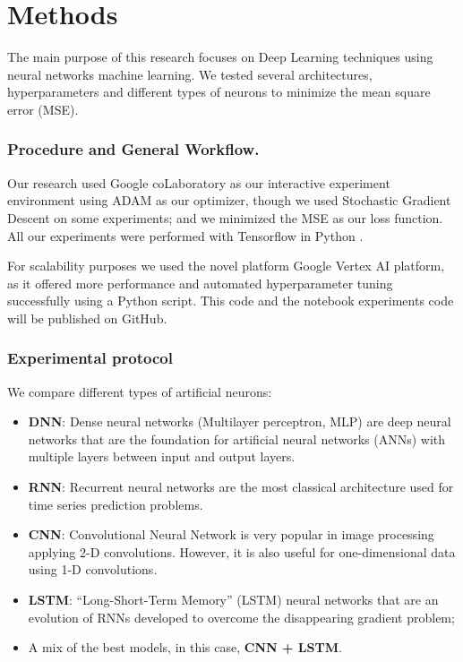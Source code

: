 \documentclass{llncs}
\begin{document}
    \hypertarget{model.}{%
\section{Methods}\label{model}}

The main purpose of this research focuses on Deep Learning techniques
using neural networks machine learning. We tested several architectures,
hyperparameters and different types of neurons to minimize the mean
square error (MSE).

\hypertarget{procedure-and-general-workflow.}{%
\subsubsection{Procedure and General
Workflow.}\label{procedure-and-general-workflow.}}

Our research used Google coLaboratory \cite{googlecolab} as our 
interactive experiment environment
using ADAM as our optimizer, though we used Stochastic Gradient Descent
on some experiments; and we minimized the MSE as our loss function. All
our experiments were performed with Tensorflow in Python \cite{abadi}.

For scalability purposes we used the novel platform 
Google Vertex AI \cite{vertexai}
platform, as it offered more performance and automated hyperparameter
tuning successfully using a Python script. This code and the notebook
experiments code will be published on GitHub.

\hypertarget{experimental-protocol}{%
\subsubsection{Experimental protocol}\label{experimental-protocol}}

We compare different types of
artificial neurons:

\begin{itemize}
\item
  \textbf{DNN}: Dense neural networks (Multilayer perceptron, MLP) are deep neural networks that are
  the foundation for artificial neural networks (ANNs) with multiple
  layers between input and output layers.
\item
  \textbf{RNN}: Recurrent neural networks are the most classical
  architecture used for time series prediction problems.
\item
  \textbf{CNN}: Convolutional Neural Network is very popular in image
  processing applying 2-D convolutions. However, it is also useful for one-dimensional data using 1-D convolutions.
\item
  \textbf{LSTM}: ``Long-Short-Term Memory'' (LSTM) neural networks that
  are an evolution of RNNs developed to overcome the disappearing
  gradient problem;
\item
  A mix of the best models, in this case, \textbf{CNN + LSTM}.%
\end{itemize}
\end{document}
